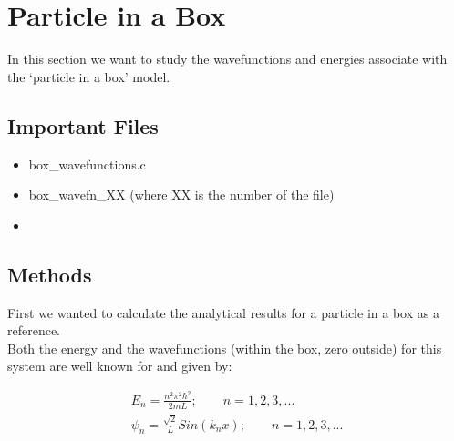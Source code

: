 \documentclass{article}
\begin{document}
\section{Particle in a Box}

In this section we want to study the wavefunctions and energies associate with the `particle in a box' model.

\subsection{Important Files}

\begin{itemize}
    \item box\_wavefunctions.c
    \item box\_wavefn\_XX       (where XX is the number of the file)
    \item 
\end{itemize}

\subsection{Methods}

First we wanted to calculate the analytical results for a particle in a box as a reference. \\
Both the energy and the wavefunctions (within the box, zero outside) for this system are well known for and given by:

\begin{gather*}

    E_{n} = \frac{n^2 \pi^2 \hbar^2 }{2 m L}; \qquad n = 1, 2, 3, ... \\
    \psi_{n} = \frac{\sqrt{2}}{L} Sin(k_{n} x) ; \qquad n = 1, 2, 3, ...

\end{gather*}
\end{document}
